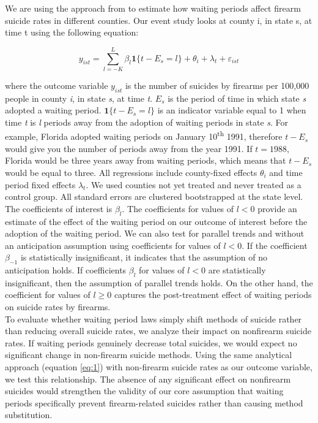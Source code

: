 We are using the approach from \textcite{callaway2021difference} to estimate how waiting periods affect firearm suicide rates in different counties. Our event study looks at county i, in state s, at time t using the following equation:

\begin{equation} \label{eq:1}
y_{ist} = \sum_{l = -K}^{L} \beta_l \mathbf{1}\{ t - E_s = l \} + \theta_i + \lambda_t + \varepsilon_{ist}
\end{equation}

where the outcome variable \textit{$y_{ist}$} is the number of suicides by firearms per 100,000 people in county \textit{i}, in state \textit{s}, at time \textit{t}. $E_s$ is the period of time in which state \textit{s} adopted a waiting period. $\mathbf{1}\{ t - E_s = l \}$ is an indicator variable equal to 1 when time \textit{t} is \textit{l} periods away from the adoption of waiting periods in state \textit{s}. For example, Florida adopted waiting periods on January 10\textsuperscript{th} 1991, therefore $t-E_s$ would give you the number of periods away from the year 1991. If $t=1988$, Florida would be three years away from waiting periods, which means that $t-E_s$ would be equal to three. All regressions include county-fixed effects $\theta_i$ and time period fixed effects $\lambda_t$. We used counties not yet treated and never treated as a control group. All standard errors are clustered bootstrapped at the state level.\\

The coefficients of interest is $ \beta_l $. The coefficients for values of $l < 0$ provide an estimate of the effect of the waiting period on our outcome of interest before the adoption of the waiting period. We can also test for parallel trends and without an anticipation assumption using coefficients for values of $l < 0$. If the coefficient $\beta_{-1}$ is statistically insignificant, it indicates that the assumption of no anticipation holds. If coefficients $ \beta_l $ for values of $l < 0$ are statistically insignificant, then the assumption of parallel trends holds. On the other hand, the coefficient for values of $l \geq 0$ captures the post-treatment effect of waiting periods on suicide rates by firearms.\\

To evaluate whether waiting period laws simply shift methods of suicide rather than reducing overall suicide rates, we analyze their impact on nonfirearm suicide rates. If waiting periods genuinely decrease total suicides, we would expect no significant change in non-firearm suicide methods. Using the same analytical approach (equation \ref{eq:1}) with non-firearm suicide rates as our outcome variable, we test this relationship. The absence of any significant effect on nonfirearm suicides would strengthen the validity of our core assumption that waiting periods specifically prevent firearm-related suicides rather than causing method substitution. 

